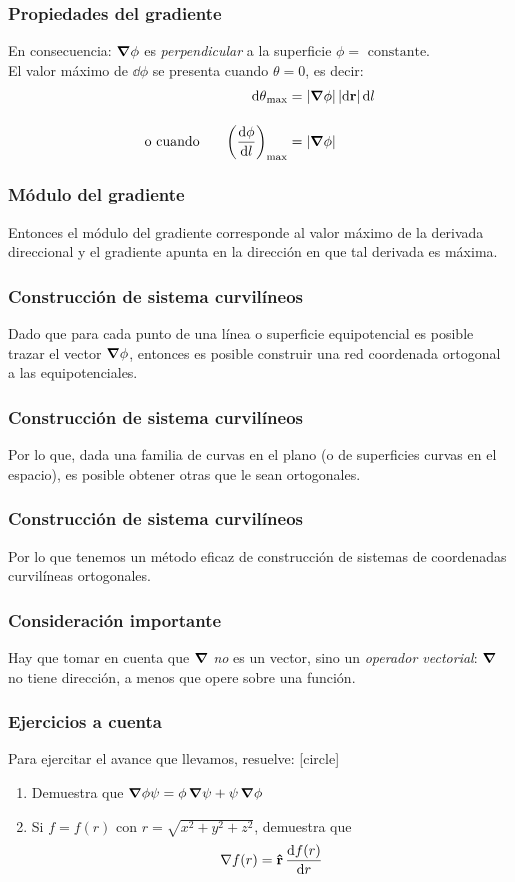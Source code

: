 \documentclass[12pt]{beamer}
\begin{document}
\begin{frame}
\frametitle{Propiedades del gradiente}
En consecuencia: $\grad{\phi}$ es \emph{perpendicular} a la superficie $\phi = \mbox{ constante}$.
\\
\bigskip
\pause
El valor máximo de $\dd{\phi}$ se presenta cuando $\theta = 0$, es decir:
\begin{align*}
\dd{\theta}_{\max} &= \abs{\grad{\phi}} \, \abs{\dd{\vb{r}}} \dd{l} \\[1em]
\mbox{o cuando } \hspace{0.5cm} \left( \dv{\phi}{l} \right)_{\max} &= \abs{\grad{\phi}}
\end{align*}
\end{frame}
\begin{frame}
\frametitle{Módulo del gradiente}
Entonces el módulo del gradiente corresponde al valor máximo de la derivada direccional y el gradiente apunta en la dirección en que tal derivada es máxima.
\end{frame}
\begin{frame}
\frametitle{Construcción de sistema curvilíneos}
Dado que para cada punto de una línea o superficie equipotencial es posible trazar el vector $\grad{\phi}$, entonces es posible construir una red coordenada ortogonal a las equipotenciales.
\end{frame}
\begin{frame}
\frametitle{Construcción de sistema curvilíneos}
Por lo que, dada una familia de curvas en el plano (o de superficies curvas en el espacio), es posible obtener otras que le sean ortogonales.
\end{frame}
\begin{frame}
\frametitle{Construcción de sistema curvilíneos}
Por lo que tenemos un método eficaz de construcción de sistemas de coordenadas curvilíneas ortogonales.
\end{frame}
\begin{frame}
\frametitle{Consideración importante}
Hay que tomar en cuenta que $\grad$ \emph{no} es un vector, sino un \emph{operador vectorial}: $\grad$ no tiene dirección, a menos que opere sobre una función.
\end{frame}
\begin{frame}
\frametitle{Ejercicios a cuenta}
Para ejercitar el avance que llevamos, resuelve:
[circle]
\begin{enumerate}
\item Demuestra que $\grad{\phi \psi} = \phi \, \grad{\psi} + \psi \, \grad{\phi}$
\item Si $f = f(r)$ con $r = \sqrt{x^{2} + y^{2}+ z^{2}}$, demuestra que
\begin{align*}
\nabla{f(r)} = \vu{r} \, \dv{f(r)}{r}
\end{align*}
\end{enumerate}
\end{frame}
\end{document}
